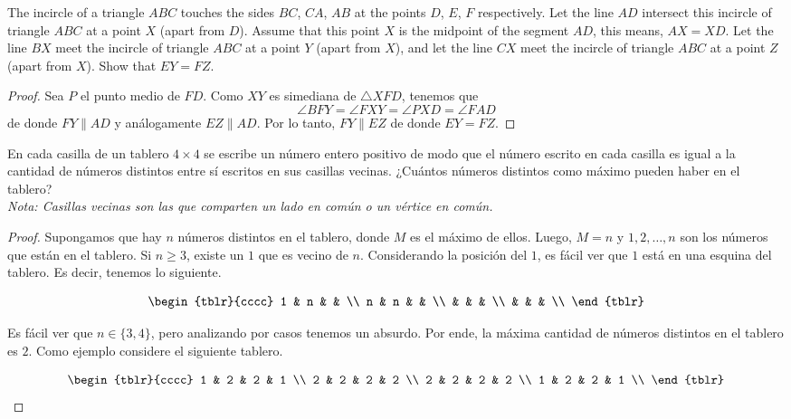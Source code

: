 \begin{probMG}[IberoAmerican 1995/5]
	The incircle of a triangle $ABC$ touches the sides $BC$, $CA$, $AB$ at the points $D$, $E$, $F$ respectively. Let the line $AD$ intersect this incircle of triangle $ABC$ at a point $X$ (apart from $D$). Assume that this point $X$ is the midpoint of the segment $AD$, this means, $AX=XD$. Let the line $BX$ meet the incircle of triangle $ABC$ at a point $Y$ (apart from $X$), and let the line $CX$ meet the incircle of triangle $ABC$ at a point $Z$ (apart from $X$). Show that $EY=FZ$.
\end{probMG}

\begin{proof}
	Sea $P$ el punto medio de $FD$. Como $XY$ es simediana de $\triangle XFD$, tenemos que
	\[\angle BFY=\angle FXY=\angle PXD=\angle FAD\]
	de donde $FY\parallel AD$ y análogamente $EZ\parallel AD$. Por lo tanto, $FY\parallel EZ$ de donde $EY=FZ$.
\end{proof}

\begin{probEB}
	En cada casilla de un tablero $4\times 4$ se escribe un número entero positivo de modo que el número escrito en cada casilla es igual a la cantidad de números distintos entre sí escritos en sus casillas vecinas. ¿Cuántos números distintos como máximo pueden haber en el tablero? \\[4pt]
	\emph{Nota: Casillas vecinas son las que comparten un lado en común o un vértice en común.}
\end{probEB}

\begin{proof}
	Supongamos que hay $n$ números distintos en el tablero, donde $M$ es el máximo de ellos. Luego, $M=n$ y $1,2,\dots,n$ son los números que están en el tablero. Si $n\ge 3$, existe un $1$ que es vecino de $n$. Considerando la posición del $1$, es fácil ver que $1$ está en una esquina del tablero. Es decir, tenemos lo siguiente.

	\[\begin{tblr}{cccc}
		1 & n & & \\
		n & n & & \\
		& & & \\
		& & & \\
	\end{tblr}\]

	Es fácil ver que $n\in\{3,4\}$, pero analizando por casos tenemos un absurdo. Por ende, la máxima cantidad de números distintos en el tablero es $2$. Como ejemplo considere el siguiente tablero.

	\[\begin{tblr}{cccc}
		1 & 2 & 2 & 1 \\
		2 & 2 & 2 & 2 \\
		2 & 2 & 2 & 2 \\
		1 & 2 & 2 & 1 \\
	\end{tblr}\]
\end{proof}

